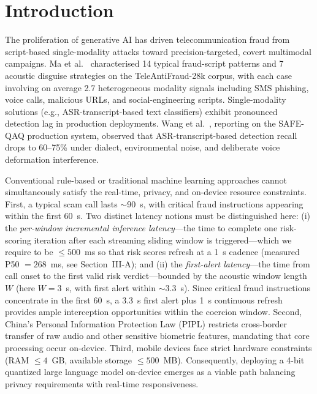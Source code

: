 \documentclass[final,5p,times,number]{elsarticle}
\begin{document}
\section{Introduction}
The proliferation of generative AI has driven telecommunication fraud from script-based single-modality attacks toward precision-targeted, covert multimodal campaigns. Ma et al.~\cite{1} characterised 14 typical fraud-script patterns and 7 acoustic disguise strategies on the TeleAntiFraud-28k corpus, with each case involving on average 2.7 heterogeneous modality signals including SMS phishing, voice calls, malicious URLs, and social-engineering scripts. Single-modality solutions (e.g., ASR-transcript-based text classifiers) exhibit pronounced detection lag in production deployments. Wang et al.~\cite{2}, reporting on the SAFE-QAQ production system, observed that ASR-transcript-based detection recall drops to 60--75\% under dialect, environmental noise, and deliberate voice deformation interference.

Conventional rule-based or traditional machine learning approaches cannot simultaneously satisfy the real-time, privacy, and on-device resource constraints. First, a typical scam call lasts $\sim$90~s, with critical fraud instructions appearing within the first 60~s. Two distinct latency notions must be distinguished here: (i) the \emph{per-window incremental inference latency}---the time to complete one risk-scoring iteration after each streaming sliding window is triggered---which we require to be $\le 500$~ms so that risk scores refresh at a 1~s cadence (measured P50 $=268$~ms, see Section~III-A); and (ii) the \emph{first-alert latency}---the time from call onset to the first valid risk verdict---bounded by the acoustic window length $W$ (here $W=3$~s, with first alert within $\sim$3.3~s). Since critical fraud instructions concentrate in the first 60~s, a 3.3~s first alert plus 1~s continuous refresh provides ample interception opportunities within the coercion window. Second, China's Personal Information Protection Law (PIPL) restricts cross-border transfer of raw audio and other sensitive biometric features, mandating that core processing occur on-device. Third, mobile devices face strict hardware constraints (RAM $\le 4$~GB, available storage $\le 500$~MB). Consequently, deploying a 4-bit quantized large language model on-device emerges as a viable path balancing privacy requirements with real-time responsiveness.
\end{document}
